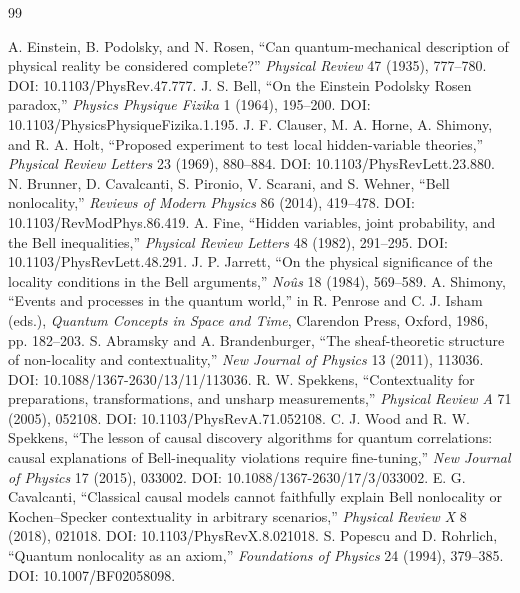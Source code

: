 \documentclass[11pt]{article}
\theoremstyle{definition}
\begin{document}
\begin{thebibliography}{99}
\small
\setlength{\itemsep}{0.15em}
\setlength{\parsep}{0pt}
\setlength{\parskip}{0pt}
\raggedright
{} A. Einstein, B. Podolsky, and N. Rosen, ``Can quantum-mechanical description of physical reality be considered complete?'' \emph{Physical Review} 47 (1935), 777--780. DOI: 10.1103/PhysRev.47.777.
 J. S. Bell, ``On the Einstein Podolsky Rosen paradox,'' \emph{Physics Physique Fizika} 1 (1964), 195--200. DOI: 10.1103/PhysicsPhysiqueFizika.1.195.
 J. F. Clauser, M. A. Horne, A. Shimony, and R. A. Holt, ``Proposed experiment to test local hidden-variable theories,'' \emph{Physical Review Letters} 23 (1969), 880--884. DOI: 10.1103/PhysRevLett.23.880.
 N. Brunner, D. Cavalcanti, S. Pironio, V. Scarani, and S. Wehner, ``Bell nonlocality,'' \emph{Reviews of Modern Physics} 86 (2014), 419--478. DOI: 10.1103/RevModPhys.86.419.
 A. Fine, ``Hidden variables, joint probability, and the Bell inequalities,'' \emph{Physical Review Letters} 48 (1982), 291--295. DOI: 10.1103/PhysRevLett.48.291.
 J. P. Jarrett, ``On the physical significance of the locality conditions in the Bell arguments,'' \emph{No\^{u}s} 18 (1984), 569--589.
 A. Shimony, ``Events and processes in the quantum world,'' in R. Penrose and C. J. Isham (eds.), \emph{Quantum Concepts in Space and Time}, Clarendon Press, Oxford, 1986, pp. 182--203.
 S. Abramsky and A. Brandenburger, ``The sheaf-theoretic structure of non-locality and contextuality,'' \emph{New Journal of Physics} 13 (2011), 113036. DOI: 10.1088/1367-2630/13/11/113036.
 R. W. Spekkens, ``Contextuality for preparations, transformations, and unsharp measurements,'' \emph{Physical Review A} 71 (2005), 052108. DOI: 10.1103/PhysRevA.71.052108.
 C. J. Wood and R. W. Spekkens, ``The lesson of causal discovery algorithms for quantum correlations: causal explanations of Bell-inequality violations require fine-tuning,'' \emph{New Journal of Physics} 17 (2015), 033002. DOI: 10.1088/1367-2630/17/3/033002.
 E. G. Cavalcanti, ``Classical causal models cannot faithfully explain Bell nonlocality or Kochen--Specker contextuality in arbitrary scenarios,'' \emph{Physical Review X} 8 (2018), 021018. DOI: 10.1103/PhysRevX.8.021018.
 S. Popescu and D. Rohrlich, ``Quantum nonlocality as an axiom,'' \emph{Foundations of Physics} 24 (1994), 379--385. DOI: 10.1007/BF02058098.

\end{thebibliography}
\end{document}
